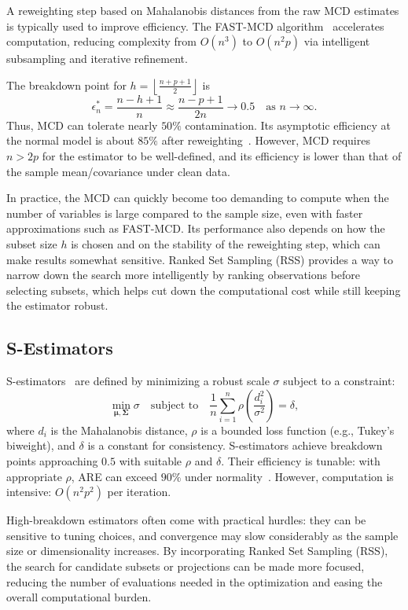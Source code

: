 \documentclass[12pt]{article}
\begin{document}
A reweighting step based on Mahalanobis distances from the raw MCD estimates is typically used to improve efficiency. The FAST-MCD algorithm~\cite{rousseeuw1999fast} accelerates computation, reducing complexity from $O(n^3)$ to $O(n^2p)$ via intelligent subsampling and iterative refinement.

The breakdown point for $h = \left\lfloor \frac{n + p + 1}{2} \right\rfloor$ is
\[
\epsilon^*_n = \frac{n - h + 1}{n} \approx \frac{n - p + 1}{2n} \rightarrow 0.5 \quad \text{as } n \to \infty.
\]
Thus, MCD can tolerate nearly $50\%$ contamination. Its asymptotic efficiency at the normal model is about $85\%$ after reweighting~\cite{maronna2019robust}. However, MCD requires $n > 2p$ for the estimator to be well-defined, and its efficiency is lower than that of the sample mean/covariance under clean data.

In practice, the MCD can quickly become too demanding to compute when the number of variables is large compared to the sample size, even with faster approximations such as FAST-MCD. Its performance also depends on how the subset size $h$ is chosen and on the stability of the reweighting step, which can make results somewhat sensitive. Ranked Set Sampling (RSS) provides a way to narrow down the search more intelligently by ranking observations before selecting subsets, which helps cut down the computational cost while still keeping the estimator robust.
\subsection{S-Estimators}
S-estimators~\cite{maronna2019robust} are defined by minimizing a robust scale $\sigma$ subject to a constraint:
\[
\min_{\bm{\mu}, \bm{\Sigma}} \sigma \quad \text{subject to} \quad \frac{1}{n} \sum_{i=1}^n \rho\left( \frac{d_i^2}{\sigma^2} \right) = \delta,
\]
where $d_i$ is the Mahalanobis distance, $\rho$ is a bounded loss function (e.g., Tukey's biweight), and $\delta$ is a constant for consistency.
S-estimators achieve breakdown points approaching $0.5$ with suitable $\rho$ and $\delta$. Their efficiency is tunable: with appropriate $\rho$, ARE can exceed $90\%$ under normality~\cite{maronna2019robust}. However, computation is intensive: $O(n^2p^2)$ per iteration.

High-breakdown estimators often come with practical hurdles: they can be sensitive to tuning choices, and convergence may slow considerably as the sample size or dimensionality increases. By incorporating Ranked Set Sampling (RSS), the search for candidate subsets or projections can be made more focused, reducing the number of evaluations needed in the optimization and easing the overall computational burden.
\end{document}
